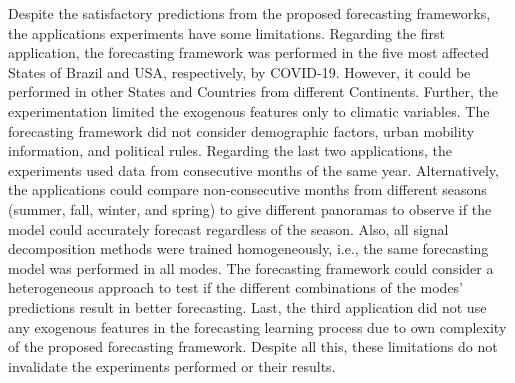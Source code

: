 Despite the satisfactory predictions from the proposed forecasting frameworks, the applications experiments have some limitations. Regarding the first application, the forecasting framework was performed in the five most affected States of Brazil and \ac{USA}, respectively, by \ac{COVID-19}. However, it could be performed in other States and Countries from different Continents. Further, the experimentation limited the exogenous features only to climatic variables. The forecasting framework did not consider demographic factors, urban mobility information, and political rules. Regarding the last two applications, the experiments used data from consecutive months of the same year. Alternatively, the applications could compare non-consecutive months from different seasons (summer, fall, winter, and spring) to give different panoramas to observe if the model could accurately forecast regardless of the season. Also, all signal decomposition methods were trained homogeneously, i.e., the same forecasting model was performed in all modes. The forecasting framework could consider a heterogeneous approach to test if the different combinations of the modes' predictions result in better forecasting. Last, the third application did not use any exogenous features in the forecasting learning process due to own complexity of the proposed forecasting framework. Despite all this, these limitations do not invalidate the experiments performed or their results.

